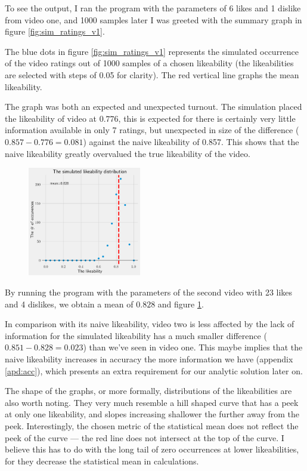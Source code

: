 \documentclass[a4paper,11pt]{article}
\begin{document}
To see the output, I ran the program with the parameters of 6 likes and 1 dislike from video one, and 1000 samples later I was greeted with the summary graph in figure \ref{fig:sim_ratings_v1}.

The blue dots in figure \ref{fig:sim_ratings_v1} represents the simulated occurrence of the video ratings out of 1000 samples of a chosen likeability (the likeabilities are selected with steps of 0.05 for clarity). The red vertical line graphs the mean likeability.

The graph was both an expected and unexpected turnout. The simulation placed the likeability of video at $0.776$, this is expected for there is certainly very little information available in only 7 ratings, but unexpected in size of the difference ($0.857-0.776=0.081$) against the naive likeability of 0.857. This shows that the naive likeability greatly overvalued the true likeability of the video.

\begin{figure}
    \includegraphics[width=0.44\textwidth,right]{assets/sim_ratings_v2.png}
    \caption{}
    \label{fig:sim_ratings_v2}
\end{figure}


By running the program with the parameters of the second video with 23 likes and 4 dislikes,
we obtain a mean of $0.828$ and figure \ref{fig:sim_ratings_v2}.

In comparison with its naive likeability, video two is less affected by the lack of information for the simulated likeability has a much smaller difference ($0.851-0.828=0.023$) than we've seen in video one. This maybe implies that the naive likeability increases in accuracy the more information we have (appendix \ref{apd:acc}), which presents an extra requirement for our analytic solution later on.

The shape of the graphs, or more formally, distributions of the likeabilities are also worth noting. They very much resemble a hill shaped curve that has a peek at only one likeability, and slopes increasing shallower the further away from the peek. Interestingly, the chosen metric of the statistical mean does not reflect the peek of the curve --- the red line does not intersect at the top of the curve. I believe this has to do with the long tail of zero occurrences at lower likeabilities, for they decrease the statistical mean in calculations.
\end{document}
